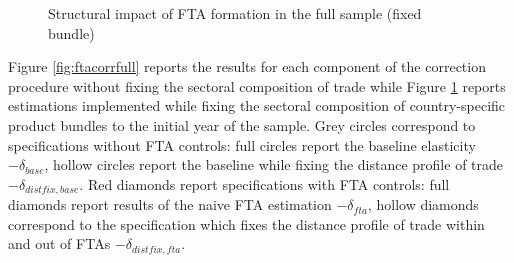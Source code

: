 \documentclass[12pt,twoside,a4paper,notitlepage]{article}
\begin{document}
\begin{figure}[h!]
\caption{Structural impact of FTA formation in the full sample (fixed bundle) \label{fig:ftacorrfullc63}}
\begin{center}
\setlength{\fboxrule}{1pt} %
\setlength{\fboxsep}{.1in} %
\end{center}
\end{figure}  

Figure \ref{fig:ftacorrfull} reports the results for each component of the correction procedure without fixing the sectoral composition of trade while Figure \ref{fig:ftacorrfullc63} reports estimations implemented while fixing the sectoral composition of country-specific product bundles to the initial year of the sample.
Grey circles correspond to specifications without FTA controls: full circles report the baseline elasticity $-\delta_{base}$, hollow circles report the baseline while fixing the distance profile of trade  $-\delta_{distfix,base}$.
Red diamonds report specifications with FTA controls: full diamonds report results of the naive FTA estimation $-\delta_{fta}$,  hollow diamonds correspond to the specification which fixes the distance profile of trade within and out of FTAs $-\delta_{distfix,fta}$.
\end{document}
